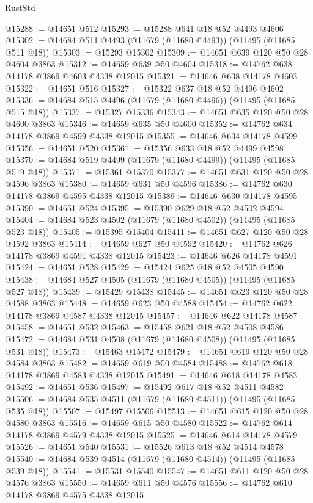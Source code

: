 \begin{lexlean}{RustStd}
\begin{coremodule}
@15288 := @14651 @512
@15293 := @15288 @641 @18 @52 @4493 @4606
@15302 := @14684 @511 @4493 (@11679 (@11680 @4493)) (@11495 (@11685 @511 @18))
@15303 := @15293 @15302
@15309 := @14651 @639 @120 @50 @28 @4604 @3863
@15312 := @14659 @639 @50 @4604
@15318 := @14762 @638 @14178 @3869 @4603 @4338 @12015
@15321 := @14646 @638 @14178 @4603
@15322 := @14651 @516
@15327 := @15322 @637 @18 @52 @4496 @4602
@15336 := @14684 @515 @4496 (@11679 (@11680 @4496)) (@11495 (@11685 @515 @18))
@15337 := @15327 @15336
@15343 := @14651 @635 @120 @50 @28 @4600 @3863
@15346 := @14659 @635 @50 @4600
@15352 := @14762 @634 @14178 @3869 @4599 @4338 @12015
@15355 := @14646 @634 @14178 @4599
@15356 := @14651 @520
@15361 := @15356 @633 @18 @52 @4499 @4598
@15370 := @14684 @519 @4499 (@11679 (@11680 @4499)) (@11495 (@11685 @519 @18))
@15371 := @15361 @15370
@15377 := @14651 @631 @120 @50 @28 @4596 @3863
@15380 := @14659 @631 @50 @4596
@15386 := @14762 @630 @14178 @3869 @4595 @4338 @12015
@15389 := @14646 @630 @14178 @4595
@15390 := @14651 @524
@15395 := @15390 @629 @18 @52 @4502 @4594
@15404 := @14684 @523 @4502 (@11679 (@11680 @4502)) (@11495 (@11685 @523 @18))
@15405 := @15395 @15404
@15411 := @14651 @627 @120 @50 @28 @4592 @3863
@15414 := @14659 @627 @50 @4592
@15420 := @14762 @626 @14178 @3869 @4591 @4338 @12015
@15423 := @14646 @626 @14178 @4591
@15424 := @14651 @528
@15429 := @15424 @625 @18 @52 @4505 @4590
@15438 := @14684 @527 @4505 (@11679 (@11680 @4505)) (@11495 (@11685 @527 @18))
@15439 := @15429 @15438
@15445 := @14651 @623 @120 @50 @28 @4588 @3863
@15448 := @14659 @623 @50 @4588
@15454 := @14762 @622 @14178 @3869 @4587 @4338 @12015
@15457 := @14646 @622 @14178 @4587
@15458 := @14651 @532
@15463 := @15458 @621 @18 @52 @4508 @4586
@15472 := @14684 @531 @4508 (@11679 (@11680 @4508)) (@11495 (@11685 @531 @18))
@15473 := @15463 @15472
@15479 := @14651 @619 @120 @50 @28 @4584 @3863
@15482 := @14659 @619 @50 @4584
@15488 := @14762 @618 @14178 @3869 @4583 @4338 @12015
@15491 := @14646 @618 @14178 @4583
@15492 := @14651 @536
@15497 := @15492 @617 @18 @52 @4511 @4582
@15506 := @14684 @535 @4511 (@11679 (@11680 @4511)) (@11495 (@11685 @535 @18))
@15507 := @15497 @15506
@15513 := @14651 @615 @120 @50 @28 @4580 @3863
@15516 := @14659 @615 @50 @4580
@15522 := @14762 @614 @14178 @3869 @4579 @4338 @12015
@15525 := @14646 @614 @14178 @4579
@15526 := @14651 @540
@15531 := @15526 @613 @18 @52 @4514 @4578
@15540 := @14684 @539 @4514 (@11679 (@11680 @4514)) (@11495 (@11685 @539 @18))
@15541 := @15531 @15540
@15547 := @14651 @611 @120 @50 @28 @4576 @3863
@15550 := @14659 @611 @50 @4576
@15556 := @14762 @610 @14178 @3869 @4575 @4338 @12015

\end{coremodule}
\end{lexlean}
